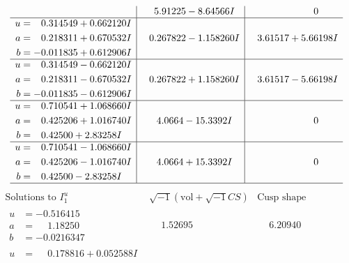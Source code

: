 \documentclass[1p]{elsarticle_modified}
\theoremstyle{definition}
\newcommand{\I}{\sqrt{-1}}
\begin{document}
$$\begin{array}{c|c|c}
 & \phantom{-}5.91225 - 8.64566 I & \phantom{-0.000000 } 0 \\ \hline\begin{aligned}
u &= \phantom{-}0.314549 + 0.662120 I \\
a &= \phantom{-}0.218311 + 0.670532 I \\
b &= -0.011835 + 0.612906 I\end{aligned}
 & \phantom{-}0.267822 - 1.158260 I & \phantom{-}3.61517 + 5.66198 I \\ \hline\begin{aligned}
u &= \phantom{-}0.314549 - 0.662120 I \\
a &= \phantom{-}0.218311 - 0.670532 I \\
b &= -0.011835 - 0.612906 I\end{aligned}
 & \phantom{-}0.267822 + 1.158260 I & \phantom{-}3.61517 - 5.66198 I \\ \hline\begin{aligned}
u &= \phantom{-}0.710541 + 1.068660 I \\
a &= \phantom{-}0.425206 + 1.016740 I \\
b &= \phantom{-}0.42500 + 2.83258 I\end{aligned}
 & \phantom{-}4.0664 - 15.3392 I & \phantom{-0.000000 } 0 \\ \hline\begin{aligned}
u &= \phantom{-}0.710541 - 1.068660 I \\
a &= \phantom{-}0.425206 - 1.016740 I \\
b &= \phantom{-}0.42500 - 2.83258 I\end{aligned}
 & \phantom{-}4.0664 + 15.3392 I & \phantom{-0.000000 } 0\\
 \hline 
 \end{array}$$\newpage$$\begin{array}{c|c|c}  
\text{Solutions to }I^u_{1}& \I (\text{vol} + \sqrt{-1}CS) & \text{Cusp shape}\\
 \hline 
\begin{aligned}
u &= -0.516415\phantom{ +0.000000I} \\
a &= \phantom{-}1.18250\phantom{ +0.000000I} \\
b &= -0.0216347\phantom{ +0.000000I}\end{aligned}
 & \phantom{-}1.52695\phantom{ +0.000000I} & \phantom{-}6.20940\phantom{ +0.000000I} \\ \hline\begin{aligned}
u &= \phantom{-}0.178816 + 0.052588 I \\

\end{aligned}
\end{array}$$
\end{document}
